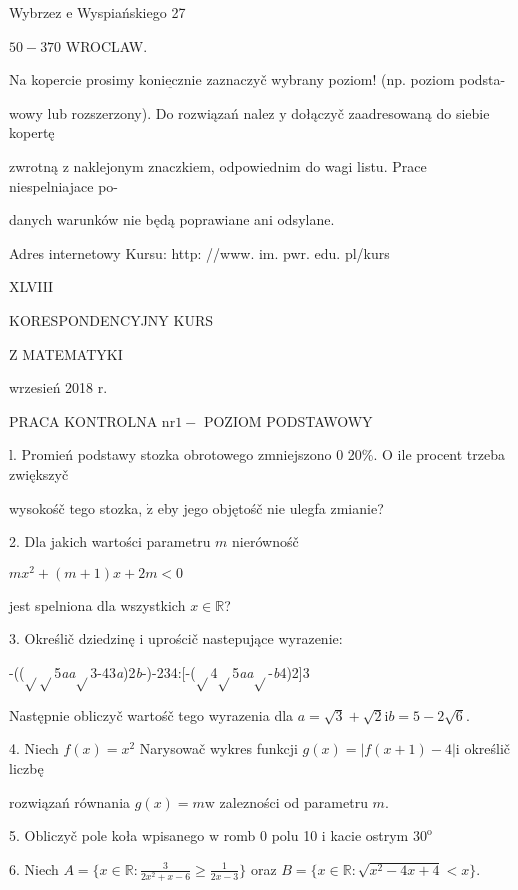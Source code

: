 \documentclass[a4paper,12pt]{article}
\begin{document}
Wybrzez $\mathrm{e}$ Wyspiańskiego 27

$50-370$ WROCLAW.

Na kopercie prosimy $\underline{\mathrm{k}\mathrm{o}\mathrm{n}\mathrm{i}\mathrm{e}\mathrm{c}\mathrm{z}\mathrm{n}\mathrm{i}\mathrm{e}}$ zaznaczyč wybrany poziom! (np. poziom podsta-

wowy lub rozszerzony). Do rozwiązań nalez $\mathrm{y}$ dołączyč zaadresowaną do siebie kopertę

zwrotną $\mathrm{z}$ naklejonym znaczkiem, odpowiednim do wagi listu. Prace niespelniajace po-

danych warunków nie będą poprawiane ani odsylane.

Adres internetowy Kursu: http: //www. im. pwr. edu. pl/kurs







XLVIII

KORESPONDENCYJNY KURS

Z MATEMATYKI

wrzesień 2018 r.

PRACA KONTROLNA $\mathrm{n}\mathrm{r} 1 -$ POZIOM PODSTAWOWY

l. Promień podstawy stozka obrotowego zmniejszono $0$ 20\%. $\mathrm{O}$ ile procent trzeba zwiększyč

wysokośč tego stozka, $\dot{\mathrm{z}}$ eby jego objętośč nie ulegfa zmianie?

2. Dla jakich wartości parametru $m$ nierównośč

$mx^{2}+(m+1)x+2m<0$

jest spelniona dla wszystkich $x\in \mathbb{R}$?

3. Określič dziedzinę $\mathrm{i}$ uprościč nastepujące wyrazenie:

-(($\sqrt{}\sqrt{}$5{\it aa}$\sqrt{}$3-43{\it a})2{\it b}-)-234:[-($\sqrt{}$4$\sqrt{}$5{\it aa}$\sqrt{}$-{\it b}4)2]3

Następnie obliczyč wartośč tego wyrazenia dla $a=\sqrt{3}+\sqrt{2} \mathrm{i} b=5-2\sqrt{6}.$

4. Niech $f(x) = x^{2}$ Narysowač wykres funkcji $g(x) = |f(x+1) -4| \mathrm{i}$ określič liczbę

rozwiązań równania $g(x)=m\mathrm{w}$ zalezności od parametru $m.$

5. Obliczyč pole koła wpisanego $\mathrm{w}$ romb $0$ polu 10 $\mathrm{i}$ kacie ostrym $30^{\mathrm{o}}$

6. Niech $A = \displaystyle \{x\in \mathbb{R}:\frac{3}{2x^{2}+x-6}\geq\frac{1}{2x-3}\}$ oraz $B = \{x\in \mathbb{R}:\sqrt{x^{2}-4x+4}<x\}.$
\end{document}
